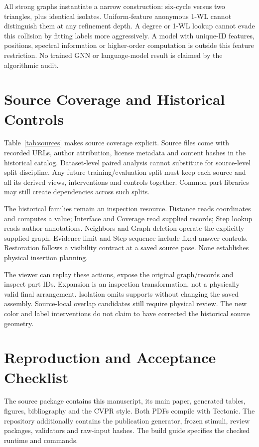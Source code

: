 \documentclass[10pt,twocolumn,letterpaper]{article}
\begin{document}
All strong graphs instantiate a narrow construction: six-cycle
versus two triangles, plus identical isolates. Uniform-feature
anonymous 1-WL cannot distinguish them at any refinement depth.
A degree or 1-WL lookup cannot evade this collision by fitting labels
more aggressively. A model with unique-ID features, positions,
spectral information or higher-order computation is outside this
feature restriction. No trained GNN or language-model result is
claimed by the algorithmic audit.

\section{Source Coverage and Historical Controls}
Table~\ref{tab:sources} makes source coverage explicit. Source files
come with recorded URLs, author attribution, license metadata and
content hashes in the historical catalog. Dataset-level paired
analysis cannot substitute for source-level split discipline.
Any future training/evaluation split must keep each source and all
its derived views, interventions and controls together. Common part
libraries may still create dependencies across such splits.

The historical families remain an inspection resource. Distance
reads coordinates and computes a value; Interface and Coverage
read supplied records; Step lookup reads author annotations.
Neighbors and Graph deletion operate the explicitly supplied graph.
Evidence limit and Step sequence include fixed-answer controls.
Restoration follows a visibility contract at a saved source pose.
None establishes physical insertion planning.

The viewer can replay these actions, expose the original graph/records
and inspect part IDs. Expansion is an inspection transformation,
not a physically valid final arrangement. Isolation omits supports
without changing the saved assembly. Source-local overlap candidates
still require physical review. The new color and label interventions
do not claim to have corrected the historical source geometry.

\section{Reproduction and Acceptance Checklist}
The source package contains this manuscript, its main paper, generated
tables, figures, bibliography and the CVPR style. Both PDFs compile
with Tectonic. The repository additionally contains the publication
generator, frozen stimuli, review packages, validators and raw-input
hashes. The build guide specifies the checked runtime and commands.
\end{document}
